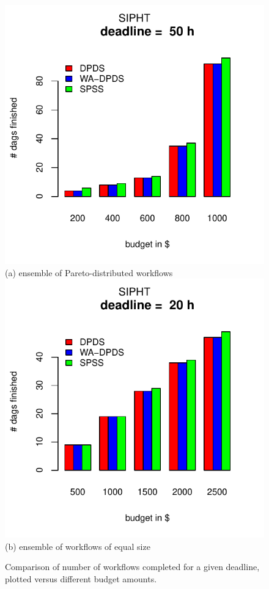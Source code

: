 \documentclass{sig-alternate}
\begin{document}
\begin{figure}[htb] \centering
\includegraphics[width=0.7\columnwidth]{figures/pareto-budget-SIPHT-n-1000-8-dagh5-50h10m0.pdf}\\
(a) ensemble of Pareto-distributed workflows
\includegraphics[width=0.7\columnwidth]{figures/constant-budget-SIPHT-n-1000-0-dagh5-50h4m0.pdf}\\
(b) ensemble of workflows of equal size \caption{Comparison of number of
workflows completed for a given deadline, plotted versus different budget
amounts.}
\label{fig:budgets}
\end{figure}
               
\end{document}
